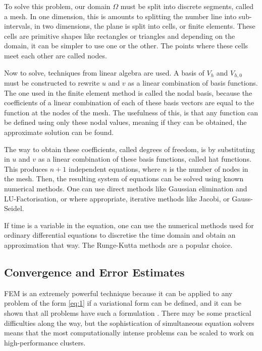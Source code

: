 To solve this problem, our domain $\Omega$ must be split into discrete segments, called a mesh. In one dimension, this is amounts to splitting the number line into sub-intervals, in two dimensions, the plane is split into cells, or finite elements. These cells are primitive shapes like rectangles or triangles and depending on the domain, it can be simpler to use one or the other. The points where these cells meet each other are called nodes.

Now to solve, techniques from linear algebra are used. A basis of $V_h$ and $V_{h,0}$ must be constructed to rewrite $u$ and $v$ as a linear combination of basis functions. The one used in the finite element method is called the nodal basis, because the coefficients of a linear combination of each of these basis vectors are equal to the function at the nodes of the mesh. The usefulness of this, is that any function can be defined using only these nodal values, meaning if they can be obtained, the approximate solution can be found.

The way to obtain these coefficients, called degrees of freedom, is by substituting in $u$ and $v$ as a linear combination of these basis functions, called hat functions. This produces $n+1$ independent equations, where $n$ is the number of nodes in the mesh. Then, the resulting system of equations can be solved using known numerical methods. One can use direct methods like Gaussian elimination and LU-Factorisation, or where appropriate, iterative methods like Jacobi, or Gauss-Seidel.

If time is a variable in the equation, one can use the numerical methods used for ordinary differential equations to discretise the time domain and obtain an approximation that way. The Runge-Kutta methods are a popular choice.

\subsection{Convergence and Error Estimates} \label{subsection:convergence}

FEM is an extremely powerful technique because it can be applied to any problem of the form \ref{eq:1} if a variational form can be defined, and it can be shown that all problems have such a formulation \cite{e-toni}. There may be some practical difficulties along the way, but the sophistication of simultaneous equation solvers means that the most computationally intense problems can be scaled to work on high-performance clusters.

